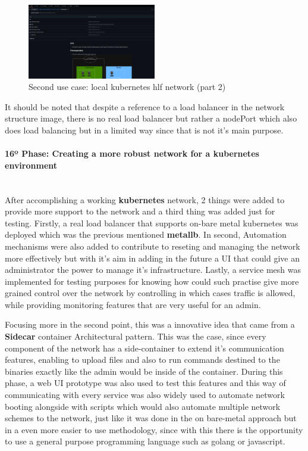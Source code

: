 \begin{figure}[H]
    \centering
    \includegraphics[width=0.5\textwidth]{assets/use-case-2/hlf-kuber-premise-network2.png} %
    \caption{Second use case: local kubernetes hlf network (part 2)}
    \label{fig:sample-image} 
\end{figure}

It should be noted that despite a reference to a load balancer in the network structure image, there is no real load balancer but rather a nodePort which also does load balancing but in a limited way since that is not it's main purpose.

\paragraph{16º Phase: Creating a more robust network for a kubernetes environment}\mbox{}\\
After accomplishing a working \textbf{kubernetes} network, 2 things were added to provide more support to the network and a third thing was added just for testing. Firstly, a real load balancer that supports on-bare metal kubernetes was deployed which was the previous mentioned \textbf{metallb}. In second, Automation mechanisms were also added to contribute to reseting and managing the network more effectively but with it's aim in adding in the future a UI that could give an administrator the power to manage it's infrastructure. Lastly, a service mesh was implemented for testing purposes for knowing how could such practise give more grained control over the network by controlling in which cases traffic is allowed, while providing monitoring features that are very useful for an admin.

Focusing more in the second point, this was a innovative idea that came from a \textbf{Sidecar} container Architectural pattern. This was the case, since every component of the network has a side-container to extend it's communication features, enabling to upload files and also to run commands destined to the binaries exactly like the admin would be inside of the container. During this phase, a web UI prototype was also used to test this features and this way of communicating with every service was also widely used to automate network booting alongside with scripts which would also automate multiple network schemes to the network, just like it was done in the on bare-metal approach but in a even more easier to use methodology, since with this there is the opportunity to use a general purpose programming language such as golang or javascript. 

